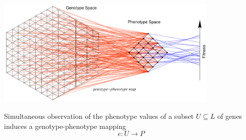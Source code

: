 \begin{frame}
\begin{center}
\includegraphics[width=0.8\textwidth]{fig/gpmap.pdf}\\
\hfill \cite{Stadler2002}
\end{center}
Simultaneous observation of the phenotype values of a subset $U \subseteq L$ of genes induces a genotype-phenotype mapping
$$
e \colon U \longrightarrow P
$$
\end{frame}
